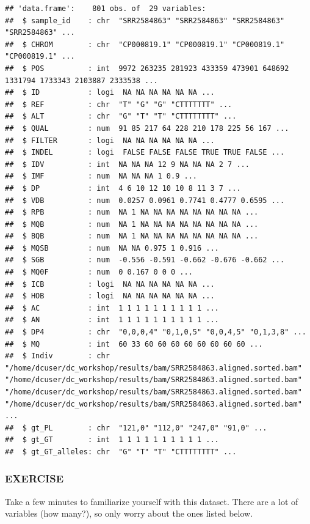 \documentclass[
]{book}
\begin{document}
\begin{verbatim}
## 'data.frame':    801 obs. of  29 variables:
##  $ sample_id    : chr  "SRR2584863" "SRR2584863" "SRR2584863" "SRR2584863" ...
##  $ CHROM        : chr  "CP000819.1" "CP000819.1" "CP000819.1" "CP000819.1" ...
##  $ POS          : int  9972 263235 281923 433359 473901 648692 1331794 1733343 2103887 2333538 ...
##  $ ID           : logi  NA NA NA NA NA NA ...
##  $ REF          : chr  "T" "G" "G" "CTTTTTTT" ...
##  $ ALT          : chr  "G" "T" "T" "CTTTTTTTT" ...
##  $ QUAL         : num  91 85 217 64 228 210 178 225 56 167 ...
##  $ FILTER       : logi  NA NA NA NA NA NA ...
##  $ INDEL        : logi  FALSE FALSE FALSE TRUE TRUE FALSE ...
##  $ IDV          : int  NA NA NA 12 9 NA NA NA 2 7 ...
##  $ IMF          : num  NA NA NA 1 0.9 ...
##  $ DP           : int  4 6 10 12 10 10 8 11 3 7 ...
##  $ VDB          : num  0.0257 0.0961 0.7741 0.4777 0.6595 ...
##  $ RPB          : num  NA 1 NA NA NA NA NA NA NA NA ...
##  $ MQB          : num  NA 1 NA NA NA NA NA NA NA NA ...
##  $ BQB          : num  NA 1 NA NA NA NA NA NA NA NA ...
##  $ MQSB         : num  NA NA 0.975 1 0.916 ...
##  $ SGB          : num  -0.556 -0.591 -0.662 -0.676 -0.662 ...
##  $ MQ0F         : num  0 0.167 0 0 0 ...
##  $ ICB          : logi  NA NA NA NA NA NA ...
##  $ HOB          : logi  NA NA NA NA NA NA ...
##  $ AC           : int  1 1 1 1 1 1 1 1 1 1 ...
##  $ AN           : int  1 1 1 1 1 1 1 1 1 1 ...
##  $ DP4          : chr  "0,0,0,4" "0,1,0,5" "0,0,4,5" "0,1,3,8" ...
##  $ MQ           : int  60 33 60 60 60 60 60 60 60 60 ...
##  $ Indiv        : chr  "/home/dcuser/dc_workshop/results/bam/SRR2584863.aligned.sorted.bam" "/home/dcuser/dc_workshop/results/bam/SRR2584863.aligned.sorted.bam" "/home/dcuser/dc_workshop/results/bam/SRR2584863.aligned.sorted.bam" "/home/dcuser/dc_workshop/results/bam/SRR2584863.aligned.sorted.bam" ...
##  $ gt_PL        : chr  "121,0" "112,0" "247,0" "91,0" ...
##  $ gt_GT        : int  1 1 1 1 1 1 1 1 1 1 ...
##  $ gt_GT_alleles: chr  "G" "T" "T" "CTTTTTTTT" ...
\end{verbatim}

\hypertarget{exercise-1}{%
\subsubsection*{EXERCISE}\label{exercise-1}}

Take a few minutes to familiarize yourself with this dataset. There are a lot of variables (how many?), so only worry about the ones listed below.
\end{document}
